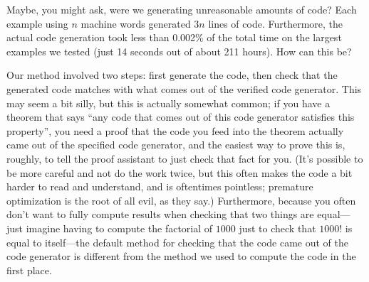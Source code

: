 Maybe, you might ask, were we generating unreasonable amounts of code?
Each example using $n$ machine words generated $3n$ lines of code.
Furthermore, the actual code generation took less than 0.002\% of the total time on the largest examples we tested (just 14 seconds out of about 211 hours).
How can this be?

Our method involved two steps: first generate the code, then check that the generated code matches with what comes out of the verified code generator.
This may seem a bit silly, but this is actually somewhat common; if you have a theorem that says ``any code that comes out of this code generator satisfies this property'', you need a proof that the code you feed into the theorem actually came out of the specified code generator, and the easiest way to prove this is, roughly, to tell the proof assistant to just check that fact for you.
(It's possible to be more careful and not do the work twice, but this often makes the code a bit harder to read and understand, and is oftentimes pointless; premature optimization is the root of all evil, as they say.)
Furthermore, because you often don't want to fully compute results when checking that two things are equal---just imagine having to compute the factorial of $1000$ just to check that $1000!$ is equal to itself---the default method for checking that the code came out of the code generator is different from the method we used to compute the code in the first place.

